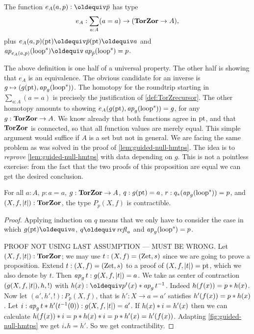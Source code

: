 \documentclass[a4,12pt]{amsart}
\begin{document}
\begin{definition}\label{def:TorZrecursor}
The function $e_A(a,p) \defeq \bar{p}$ has type
\[
e_A : \sum_{a:A}(a=a) \to (\mathbf{TorZor} \to A),
\]
plus $e_A(a,p)(\pt) \jdeq \bar{p}(\pt) \jdeq a$ and 
$\ap{e_A(a,p)}(\Zloop)\jdeq\ap{\bar{p}}(\Zloop) = p$.
\end{definition}

The above definition is one half of a universal property.
The other half is showing that $e_A$ is an equivalence.
The obvious candidate for an inverse is 
$g\mapsto (g({\mathord{\mathrm{pt}}}),\mathop{{\it ap}_{g}}(\mathrm{loop}^s))$.
The homotopy for the roundtrip starting in $\sum_{a:A}(a=a)$
is precisely the justification of \cref{def:TorZrecursor}.
The other homotopy amounts to showing
$e_A(g({\mathord{\mathrm{pt}}}),\mathop{{\it ap}_{g}}(\mathrm{loop}^s)) = g$, for any $g:\mathbf{TorZor}\to A$.
We know already that both functions agree in ${\mathord{\mathrm{pt}}}$,
and that $\mathbf{TorZor}$ is connected, so that all function values
are merely equal. This simple argument would suffice if
$A$ is a set but not in general. We are facing the same
problem as was solved in the proof of \cref{lem:guided-null-hmtps}.
The idea is to \emph{reprove} \cref{lem:guided-null-hmtps}
with data depending on $g$. This is not a pointless exercise:
from the fact that the two proofs of this proposition are equal
we can get the desired conclusion.

\begin{lemma}\label{lem:redo-g-null-hmtps}
For all $a:A$, $p:a=a$, $g:\mathbf{TorZor}\to A$,
$q: g({\mathord{\mathrm{pt}}}) = a$, $r: q_*(\mathop{{\it ap}_{g}}(\mathrm{loop}^s)) = p$, 
and $(X,f,\lvert t\rvert):\mathbf{TorZor}$, the type $P_p(X,f)$ is contractible.
\end{lemma}
\begin{proof}
Applying induction on $q$ means that we only have to consider the
case in which $g(\pt)\jdeq a$, $q\jdeq\refl{a}$ and
$\mathop{{\it ap}_{g}}(\mathrm{loop}^s) = p$. 

PROOF NOT USING LAST ASSUMPTION --- MUST BE WRONG.
Let $(X,f,\lvert t\rvert):\mathbf{TorZor}$; we may use $t:(X,f)=(\mathrm{Zet},s)$ since we
are going to prove a proposition.
Extend $t: (X,f)=(\mathrm{Zet},s)$ to a proof of $(X,f,\lvert t\rvert) = {\mathord{\mathrm{pt}}}$,
which we also denote by $t$. Then $\mathop{{\it ap}_{g}} t : g(X,f,\lvert t\rvert) = a$.
We take as center of contraction $(g(X,f,\lvert t\rvert),h,!)$
with $h(x) \defeq p^t(x) \ct \ap{g} t^{-1}$. Indeed $h(f(x))=p* h(x)$.
Now let $(a',h',!) : P_p(X,f)$, that is $h': X\to a=a'$ satisfies
$h'(f(x)) = p* h(x)$. Let 
$i: \mathop{{\it ap}_{g}} t * h'(t^{-1}(0)): g(X,f,\lvert t\rvert) = a'$.
If $h(x)* i = h'(x)$ then we can
calculate $h(f(x))* i = p* h(x)* i = p* h'(x) = h'(f(x))$.
Adapting \cref{fig:guided-null-hmtps} we get $i_* h = h'$.
So we get contractibility.
\end{proof}






\end{document}
